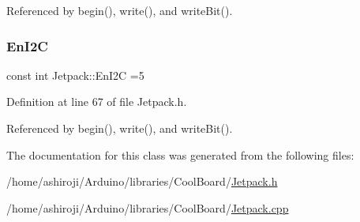 Referenced by begin(), write(), and write\+Bit().

\mbox{\label{classJetpack_a81df984fb4cea98c71aa1a1cfcdfe814}} 
\subsubsection{\texorpdfstring{En\+I2C}{EnI2C}}
{\footnotesize\ttfamily const int Jetpack\+::\+En\+I2C =5\hspace{0.3cm}{\ttfamily [private]}}



Definition at line 67 of file Jetpack.\+h.



Referenced by begin(), write(), and write\+Bit().



The documentation for this class was generated from the following files\+:\begin{DoxyCompactItemize}
\item 
/home/ashiroji/\+Arduino/libraries/\+Cool\+Board/\hyperlink{Jetpack_8h}{Jetpack.\+h}\item 
/home/ashiroji/\+Arduino/libraries/\+Cool\+Board/\hyperlink{Jetpack_8cpp}{Jetpack.\+cpp}\end{DoxyCompactItemize}
